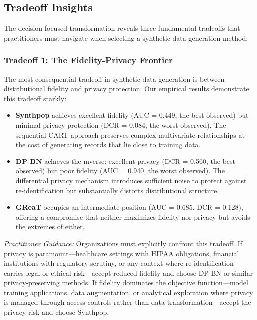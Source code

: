 \documentclass[12pt,a4paper]{article}
\begin{document}
\subsection{Tradeoff Insights}

The decision-focused transformation reveals three fundamental tradeoffs that practitioners must navigate when selecting a synthetic data generation method.

\subsubsection{Tradeoff 1: The Fidelity-Privacy Frontier}

The most consequential tradeoff in synthetic data generation is between distributional fidelity and privacy protection. Our empirical results demonstrate this tradeoff starkly:

\begin{itemize}
    \item \textbf{Synthpop} achieves excellent fidelity (AUC = 0.449, the best observed) but minimal privacy protection (DCR = 0.084, the worst observed). The sequential CART approach preserves complex multivariate relationships at the cost of generating records that lie close to training data.
    \item \textbf{DP BN} achieves the inverse: excellent privacy (DCR = 0.560, the best observed) but poor fidelity (AUC = 0.940, the worst observed). The differential privacy mechanism introduces sufficient noise to protect against re-identification but substantially distorts distributional structure.
    \item \textbf{GReaT} occupies an intermediate position (AUC = 0.685, DCR = 0.128), offering a compromise that neither maximizes fidelity nor privacy but avoids the extremes of either.
\end{itemize}

\textit{Practitioner Guidance:} Organizations must explicitly confront this tradeoff. If privacy is paramount---healthcare settings with HIPAA obligations, financial institutions with regulatory scrutiny, or any context where re-identification carries legal or ethical risk---accept reduced fidelity and choose DP BN or similar privacy-preserving methods. If fidelity dominates the objective function---model training applications, data augmentation, or analytical exploration where privacy is managed through access controls rather than data transformation---accept the privacy risk and choose Synthpop.
\end{document}
